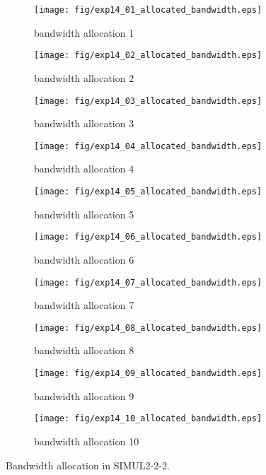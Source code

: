 	\begin{figure}
		\begin{center}
			\begin{subfigure}[b]{0.32\textwidth}
				\texttt{[image: fig/exp14\_01\_allocated\_bandwidth.eps]}
				\caption{bandwidth allocation 1}
				\label{figure:simul2_2_2_b_a}
			\end{subfigure}
			\begin{subfigure}[b]{0.32\textwidth}
				\texttt{[image: fig/exp14\_02\_allocated\_bandwidth.eps]}
				\caption{bandwidth allocation 2}
				\label{figure:simul2_2_2_b_b}
			\end{subfigure}
			\begin{subfigure}[b]{0.32\textwidth}
				\texttt{[image: fig/exp14\_03\_allocated\_bandwidth.eps]}
				\caption{bandwidth allocation 3}
				\label{figure:simul2_2_2_b_c}
			\end{subfigure}
			\begin{subfigure}[b]{0.32\textwidth}
				\texttt{[image: fig/exp14\_04\_allocated\_bandwidth.eps]}
				\caption{bandwidth allocation 4}
				\label{figure:simul2_2_2_b_d}
			\end{subfigure}
			\begin{subfigure}[b]{0.32\textwidth}
				\texttt{[image: fig/exp14\_05\_allocated\_bandwidth.eps]}
				\caption{bandwidth allocation 5}
				\label{figure:simul2_2_2_b_e}
			\end{subfigure}
			\begin{subfigure}[b]{0.32\textwidth}
				\texttt{[image: fig/exp14\_06\_allocated\_bandwidth.eps]}
				\caption{bandwidth allocation 6}
				\label{figure:simul2_2_2_b_f}
			\end{subfigure}
			\begin{subfigure}[b]{0.32\textwidth}
				\texttt{[image: fig/exp14\_07\_allocated\_bandwidth.eps]}
				\caption{bandwidth allocation 7}
				\label{figure:simul2_2_2_b_g}
			\end{subfigure}
			\begin{subfigure}[b]{0.32\textwidth}
				\texttt{[image: fig/exp14\_08\_allocated\_bandwidth.eps]}
				\caption{bandwidth allocation 8}
				\label{figure:simul2_2_2_b_h}
			\end{subfigure}
			\begin{subfigure}[b]{0.32\textwidth}
				\texttt{[image: fig/exp14\_09\_allocated\_bandwidth.eps]}
				\caption{bandwidth allocation 9}
				\label{figure:simul2_2_2_b_i}
			\end{subfigure}
			\begin{subfigure}[b]{0.32\textwidth}
				\texttt{[image: fig/exp14\_10\_allocated\_bandwidth.eps]}
				\caption{bandwidth allocation 10}
				\label{figure:simul2_2_2_b_j}
			\end{subfigure}
			\caption{Bandwidth allocation in SIMUL2-2-2.}
			\label{figure:simul2_2_2_ba}
		\end{center}
	\end{figure}


